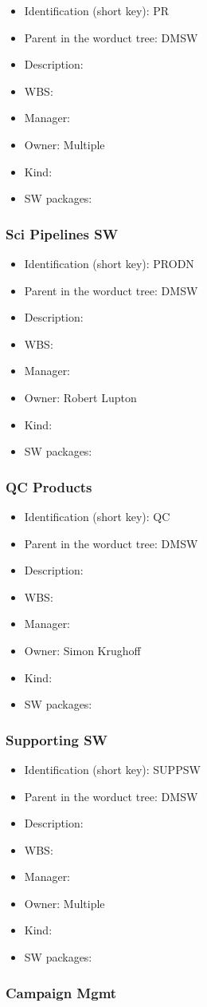 \begin{itemize}\item Identification (short key): PR
\item Parent in the worduct tree: DMSW
\item Description: 
\item WBS: 
\item Manager: 
\item Owner: Multiple
\item Kind:
\item SW packages: 
\end{itemize}\subsubsection{Sci Pipelines SW}
\begin{itemize}\item Identification (short key): PRODN
\item Parent in the worduct tree: DMSW
\item Description: 
\item WBS: 
\item Manager: 
\item Owner: Robert Lupton
\item Kind:
\item SW packages: 
\end{itemize}\subsubsection{QC Products}
\begin{itemize}\item Identification (short key): QC
\item Parent in the worduct tree: DMSW
\item Description: 
\item WBS: 
\item Manager: 
\item Owner: Simon Krughoff
\item Kind:
\item SW packages: 
\end{itemize}\subsubsection{Supporting SW}
\begin{itemize}\item Identification (short key): SUPPSW
\item Parent in the worduct tree: DMSW
\item Description: 
\item WBS: 
\item Manager: 
\item Owner: Multiple
\item Kind:
\item SW packages: 
\end{itemize}\subsubsection{Campaign Mgmt}
